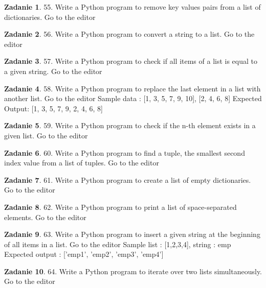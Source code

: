 \documentclass[11pt]{article}
\theoremstyle{definition}
\newtheorem{zadanie}{Zadanie}
\begin{document}
\begin{zadanie}
55. Write a Python program to remove key values pairs from a list of dictionaries. Go to the editor
\end{zadanie}

\begin{zadanie}
56. Write a Python program to convert a string to a list. Go to the editor
\end{zadanie}

\begin{zadanie}
57. Write a Python program to check if all items of a list is equal to a given string. Go to the editor
\end{zadanie}

\begin{zadanie}
58. Write a Python program to replace the last element in a list with another list. Go to the editor
Sample data : [1, 3, 5, 7, 9, 10], [2, 4, 6, 8]
Expected Output: [1, 3, 5, 7, 9, 2, 4, 6, 8]
\end{zadanie}

\begin{zadanie}
59. Write a Python program to check if the n-th element exists in a given list. Go to the editor
\end{zadanie}

\begin{zadanie}
60. Write a Python program to find a tuple, the smallest second index value from a list of tuples. Go to the editor
\end{zadanie}

\begin{zadanie}
61. Write a Python program to create a list of empty dictionaries. Go to the editor
\end{zadanie}

\begin{zadanie}
62. Write a Python program to print a list of space-separated elements. Go to the editor
\end{zadanie}

\begin{zadanie}
63. Write a Python program to insert a given string at the beginning of all items in a list. Go to the editor
Sample list : [1,2,3,4], string : emp
Expected output : ['emp1', 'emp2', 'emp3', 'emp4']
\end{zadanie}

\begin{zadanie}
64. Write a Python program to iterate over two lists simultaneously. Go to the editor
\end{zadanie}
\end{document}
